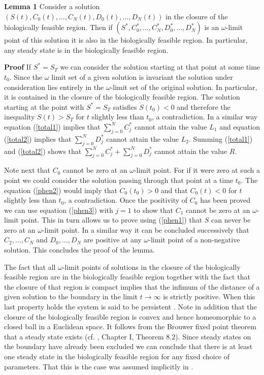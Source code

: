 \documentclass{article}
\begin{document}
\noindent
{\bf Lemma 1} Consider a solution 
$(S(t),C_0(t),\ldots,C_N(t), D_0(t),\ldots,D_N(t))$ in the closure of 
the biologically feasible region. Then if 
$(S^*,C_0^*,\ldots,C_N^*,D_0^*,\ldots,D_N^*)$ is an $\omega$-limit point 
of this solution it
is also in the biologically feasible region. In particular, any
steady state is in the biologically feasible region.

\noindent
{\bf Proof} If $S^*=S_T$ we can consider the solution starting at that point 
at some time $t_0$. Since the $\omega$ limit set of a given solution is 
invariant the solution under consideration lies entirely in the $\omega$-limit
set of the original solution. In particular, it is contained in the closure of
the biologically feasible region. The solution starting at the point with
$S^*=S_T$ satisfies $\dot S(t_0)<0$ and therefore the inequality $S(t)>S_T$ for 
$t$ slightly less than $t_0$, a contradiction. In a similar way equation
(\ref{total1}) implies that $\sum_{j=0}^NC^*_j$ cannot attain the value $L_1$
and equation (\ref{total2}) implies that $\sum_{j=0}^ND^*_j$ cannot attain the 
value $L_2$. Summing (\ref{total1}) and (\ref{total2}) shows that 
$\sum_{j=0}^NC^*_j+\sum_{j=0}^ND^*_j$ cannot attain the value $R$.

Note next that $C_0$ cannot be zero at an $\omega$-limit point. For if it
were zero at such a point we could consider the solution passing through that 
point at a time $t_0$. The equation (\ref{phen2}) would imply that 
$\dot C_0(t_0)>0$ and that $C_0(t)<0$ for $t$ slightly less than $t_0$, a
contradiction. Once the positivity of $C_0$ has been proved we can use 
equation (\ref{phen3}) with $j=1$ to show that $C_1$ cannot be zero at an 
$\omega$-limit point. This in turn allows us to prove using (\ref{phen1}) that 
$S$ can never be zero at an $\omega$-limit point.
In a similar way it can be concluded successively that $C_2,\ldots,C_N$ and 
$D_0,\ldots,D_N$ are positive at any $\omega$-limit point of a non-negative 
solution. This concludes the proof of the lemma.

The fact that all $\omega$-limit points of solutions in the closure of the
biologically feasible region are in the biologically feasible region together
with the fact that the closure of that region is compact implies that the 
infimum of the distance of a given solution to the boundary in the limit 
$t\to\infty$ is strictly positive. When this last property holds the system
is said to be persistent \cite{butler86}. Note in addition that the 
closure of the biologically feasible region is convex and hence homeomorphic 
to a closed ball in a Euclidean space. It follows from the Brouwer fixed 
point theorem that a steady state exists (cf. \cite{hale09}, Chapter I, 
Theorem 8.2). Since steady states on 
the boundary have already been excluded we can conclude that there is at least 
one steady state in the biologically feasible region for any fixed choice of 
parameters. That this is the case was assumed implicitly in \cite{francois13}.
\end{document}
